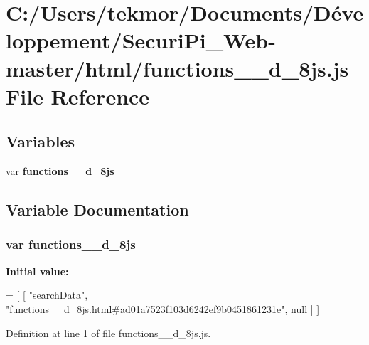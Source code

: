 \section{C\+:/\+Users/tekmor/\+Documents/\+Développement/\+Securi\+Pi\+\_\+\+Web-\/master/html/functions\+\_\+\+\_\+d\+\_\+8js.js File Reference}
\label{functions____d__8js_8js}
\subsection*{Variables}
\begin{DoxyCompactItemize}
\item 
var {\bf functions\+\_\+\+\_\+d\+\_\+8js}
\end{DoxyCompactItemize}


\subsection{Variable Documentation}
\subsubsection[{functions\+\_\+\+\_\+d\+\_\+8js}]{\setlength{\rightskip}{0pt plus 5cm}var functions\+\_\+\+\_\+d\+\_\+8js}\label{functions____d__8js_8js_a4ddbc42de5d870562bd295d145566561}
{\bfseries Initial value\+:}
\begin{DoxyCode}
=
[
    [ \textcolor{stringliteral}{"searchData"}, \textcolor{stringliteral}{"functions\_\_d\_8js.html#ad01a7523f103d6242ef9b0451861231e"}, null ]
]
\end{DoxyCode}


Definition at line 1 of file functions\+\_\+\+\_\+d\+\_\+8js.\+js.

